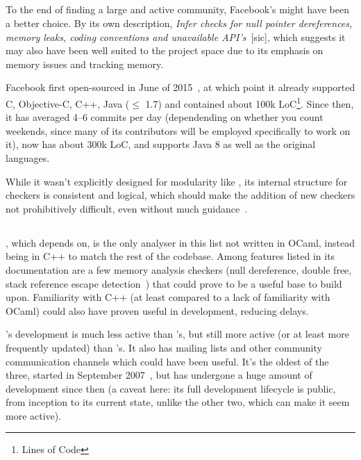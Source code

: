 \subsection{}

To the end of finding a large and active community, Facebook's  might have been a better choice. By its own description, \textit{Infer checks for null pointer dereferences, memory leaks, coding conventions and unavailable API’s}~[sic], which suggests it may also have been well suited to the project space due to its emphasis on memory issues and tracking memory.

Facebook first open-sourced  in June of 2015~\cite{infergit}, at which point it already supported C, Objective-C, C++, Java ($\le$ 1.7) and contained about 100k LoC\footnote{Lines of Code}. Since then, it has averaged 4–6 commits per day (dependending on whether you count weekends, since many of its contributors will be employed specifically to work on it), now has about 300k LoC, and supports Java 8 as well as the original languages.

While it wasn't explicitly designed for modularity like , its internal structure for checkers is consistent and logical, which should make the addition of new checkers not prohibitively difficult, even without much guidance~\cite{infercheckers}.

\subsection{}

, which  depends on, is the only analyser in this list not written in OCaml, instead being in C++ to match the rest of the  codebase. Among features listed in its documentation are a few memory analysis checkers (null dereference, double free, stack reference escape detection~\cite{clangchecks}) that could prove to be a useful base to build upon. Familiarity with C++ (at least compared to a lack of familiarity with OCaml) could also have proven useful in development, reducing delays.

's development is much less active than 's, but still more active (or at least more frequently updated) than 's. It also has mailing lists and other community communication channels which could have been useful. It's the oldest of the three, started in September 2007~\cite{clangrelease}, but has undergone a huge amount of development since then (a caveat here: its full development lifecycle is public, from inception to its current state, unlike the other two, which can make it seem more active).

